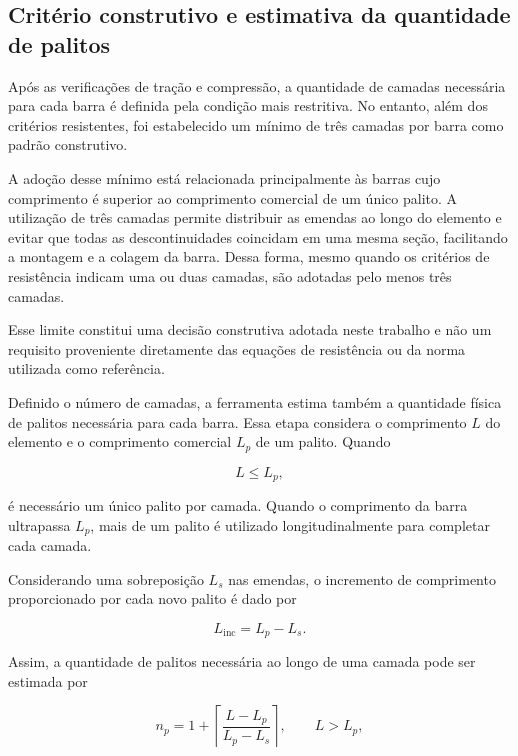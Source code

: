 \subsection{Critério construtivo e estimativa da quantidade de palitos}
\label{subsec:metodologia-quantidade-palitos}

Após as verificações de tração e compressão, a quantidade de camadas necessária para cada barra é definida pela condição mais restritiva. No entanto, além dos critérios resistentes, foi estabelecido um mínimo de três camadas por barra como padrão construtivo.

A adoção desse mínimo está relacionada principalmente às barras cujo comprimento é superior ao comprimento comercial de um único palito. A utilização de três camadas permite distribuir as emendas ao longo do elemento e evitar que todas as descontinuidades coincidam em uma mesma seção, facilitando a montagem e a colagem da barra. Dessa forma, mesmo quando os critérios de resistência indicam uma ou duas camadas, são adotadas pelo menos três camadas.

Esse limite constitui uma decisão construtiva adotada neste trabalho e não um requisito proveniente diretamente das equações de resistência ou da norma utilizada como referência.

Definido o número de camadas, a ferramenta estima também a quantidade física de palitos necessária para cada barra. Essa etapa considera o comprimento \(L\) do elemento e o comprimento comercial \(L_p\) de um palito. Quando

\begin{equation}
    L \leq L_p,
\end{equation}

é necessário um único palito por camada. Quando o comprimento da barra ultrapassa \(L_p\), mais de um palito é utilizado longitudinalmente para completar cada camada.

Considerando uma sobreposição \(L_s\) nas emendas, o incremento de comprimento proporcionado por cada novo palito é dado por

\begin{equation}
    L_{\mathrm{inc}} = L_p - L_s.
\end{equation}

Assim, a quantidade de palitos necessária ao longo de uma camada pode ser estimada por

\begin{equation}
    n_p =
    1+
    \left\lceil
    \frac{L-L_p}{L_p-L_s}
    \right\rceil,
    \qquad L>L_p,
\end{equation}

